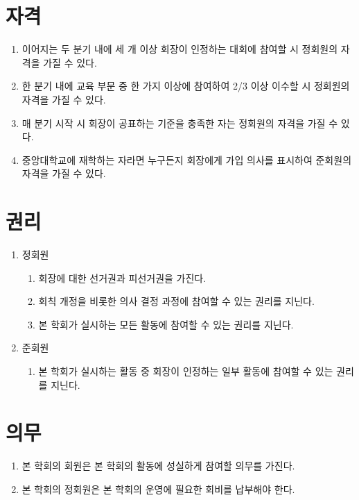 \documentclass{oblivoir}
\begin{document}
\section{자격}
\label{자격 조항}
\begin{enumerate}
    \item \label{정회원 자격 1}이어지는 두 분기 내에 세 개 이상 회장이 인정하는 대회에 참여할 시 정회원의 자격을
          가질 수 있다.
    \item \label{정회원 자격 2}한 분기 내에 교육 부문 중 한 가지 이상에 참여하여 2/3 이상 이수할 시 정회원의 자격을 가질 수 있다.
    \item \label{정회원 자격 3}매 분기 시작 시 회장이 공표하는 기준을 충족한 자는 정회원의 자격을 가질 수 있다.
    \item 중앙대학교에 재학하는 자라면 누구든지 회장에게 가입 의사를 표시하여 준회원의 자격을 가질 수 있다.
\end{enumerate}

\section{권리}
\begin{enumerate}
    \item 정회원
          \begin{enumerate}
              \item 회장에 대한 선거권과 피선거권을 가진다.
              \item 회칙 개정을 비롯한 의사 결정 과정에 참여할 수 있는 권리를 지닌다.
              \item 본 학회가 실시하는 모든 활동에 참여할 수 있는 권리를 지닌다.
          \end{enumerate}
    \item 준회원
          \begin{enumerate}
            \item 본 학회가 실시하는 활동 중 회장이 인정하는 일부 활동에 참여할 수 있는 권리를 지닌다.
          \end{enumerate}
\end{enumerate}

\section{의무}
\begin{enumerate}
    \item 본 학회의 회원은 본 학회의 활동에 성실하게 참여할 의무를 가진다.
    \item 본 학회의 정회원은 본 학회의 운영에 필요한 회비를 납부해야 한다.
\end{enumerate}
\end{document}
